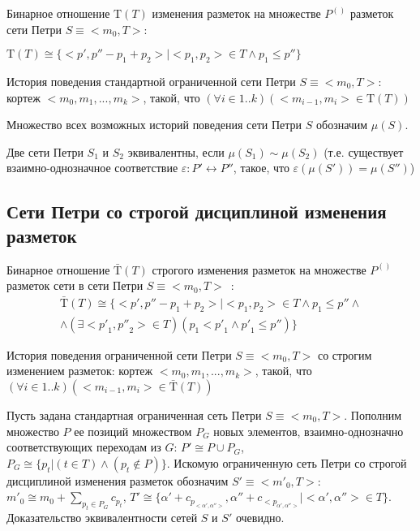 	Бинарное отношение $\mathrm{T}(T)$ изменения разметок на множестве $P^{()}$ разметок сети Петри $S\equiv < m_0, T >$:
	\begin{center}
		$\mathrm{T}(T)\cong\{<p',p''-p_1+p_2>|<p_1,p_2> \in T \wedge p_1\leq p''\}$
	\end{center}

	История поведения стандартной ограниченной сети Петри $S\equiv < m_0, T >$: кортеж $<m_0,m_1,...,m_k>$, 
	такой, что $(\forall i \in 1..k)(<m_{i-1}, m_i> \in \mathrm{T}(T))$
	
	Множество всех возможных историй поведения сети Петри $S$ обозначим $\mu(S)$.
	
	Две сети Петри $S_1$ и $S_2$ эквивалентны, если $\mu(S_1) \sim \mu(S_2)$ (т.е. существует взаимно-однозначное соответствие $\varepsilon:P'\leftrightarrow P''$, такое, что $\varepsilon(\mu(S')) = \mu(S'')$)
	
  \subsection{Сети Петри со строгой дисциплиной изменения разметок}
	Бинарное отношение $\bar{\mathrm{T}}(T)$ строгого изменения разметок на множестве $P^{()}$ 
	разметок сети в сети Петри $S\equiv < m_0, T >$~\cite{falkTheory}:
	\begin{equation}
		\begin{multlined}
			\bar{\mathrm{T}}(T)\cong\{<p',p''-p_1+p_2>|<p_1,p_2> \in T \wedge p_1\leq p'' \wedge\\
			\wedge (\exists<{p'}_1, {p''}_2> \in T)(p_1 < {p'}_1 \wedge {p'}_1 \leq p'') \}
		\end{multlined}
	\end{equation}
	  
	История поведения ограниченной сети Петри $S\equiv < m_0, T >$ со строгим изменением разметок: кортеж  $<m_0,m_1,...,m_k>$, 
	такой, что\\ $(\forall i \in 1..k)(<m_{i-1}, m_i> \in \bar{\mathrm{T}}(T))$
	  
	Пусть задана стандартная ограниченная сеть Петри $S\equiv < m_0, T >$. Пополним множество $P$ ее позиций множеством $P_G$ новых элементов,
	взаимно-однозначно соответствующих переходам из $G$: $P'\cong P\cup P_G$,\\ 
	$P_G\cong \{p_t|(t\in T)\wedge (p_t \notin P)\}$. Искомую ограниченную сеть Петри со строгой дисциплиной изменения разметок 
	обозначим $S'\equiv  < {m'}_0, T >$:\\
	${m'}_0\cong m_0 +\displaystyle\sum_{p_t\in P_G}c_{p_t}$,
	$T'\cong\{\alpha'+c_{p_{<\alpha',\alpha''>}}, \alpha'' +c_{<p_{\alpha',\alpha''>}}|<\alpha',\alpha''> \in T\} $.
	Доказательство эквивалентности сетей $S$ и $S'$ очевидно.
